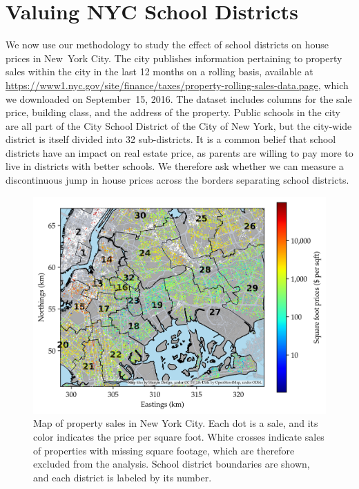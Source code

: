 \section{Valuing NYC School Districts}
\label{sec:NYC_example}

We now use our methodology to study the effect
of school districts on house prices in New~York City.
The city publishes information pertaining to property sales within the city in the last 12 months on a rolling basis,
available at \url{https://www1.nyc.gov/site/finance/taxes/property-rolling-sales-data.page},
which we downloaded on September~15, 2016.
The dataset includes columns for the sale price, building class, and the address of the property.
Public schools in the city are all part of the City School District of the City of New York, but the city-wide district is itself divided into 32 sub-districts.
It is a common belief that school districts have an impact on real estate price, as parents are willing to pay more to live in districts with better schools.
We therefore ask whether we can measure a discontinuous jump in house prices across the borders separating school districts.

\begin{figure}[tb]
    \centering
    \includegraphics[width=\textwidth,height=0.4\textheight,keepaspectratio]{figures/sales_map.png}
    \caption{\label{fig:sales_map}Map of property sales in New York City. Each dot is a sale, and its color indicates the price per square foot. White crosses indicate sales of properties with missing square footage, which are therefore excluded from the analysis. School district boundaries are shown, and each district is labeled by its number.}
\end{figure}

